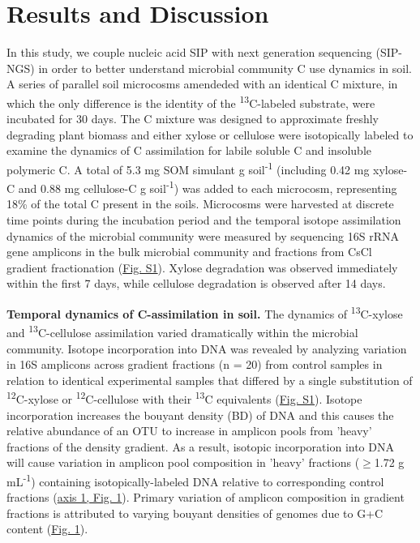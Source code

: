 \section{Results and Discussion}

In this study, we couple nucleic acid SIP with next generation sequencing (SIP-NGS) in order to better understand microbial community C use dynamics in soil. A series of parallel soil microcosms amendeded with an identical C mixture, in which the only difference is the identity of the \textsuperscript{13}C-labeled substrate, were incubated for 30 days. The C mixture was designed to approximate freshly degrading plant biomass and either xylose or cellulose were isotopically labeled to examine the dynamics of C assimilation for labile soluble C and insoluble polymeric C. A total of 5.3 mg SOM simulant g soil\textsuperscript{-1} (including 0.42 mg xylose-C and 0.88 mg cellulose-C g soil\textsuperscript{-1}) was added to each microcosm, representing 18\% of the total C present in the soils. Microcosms were harvested at discrete time points during the incubation period and the temporal isotope assimilation dynamics of the microbial community were measured by sequencing 16S rRNA gene amplicons in the bulk microbial community and fractions from CsCl gradient fractionation (\href{https://www.authorea.com/users/3537/articles/8459/master/file/figures/20140708_ConceptualFig2/20140708_ConceptualFig2.pdf}{Fig. S1}). Xylose degradation was observed immediately within the first 7 days, while cellulose degradation is observed after 14 days.

\textbf{Temporal dynamics of C-assimilation in soil.}  
The dynamics of \textsuperscript{13}C-xylose and \textsuperscript{13}C-cellulose assimilation varied dramatically within the microbial community. Isotope incorporation into DNA was revealed by analyzing variation in 16S amplicons across gradient fractions (n = 20) from control samples in relation to identical experimental samples that differed by a single substitution of \textsuperscript{12}C-xylose or \textsuperscript{12}C-cellulose with their \textsuperscript{13}C equivalents (\href{https://www.authorea.com/users/3537/articles/8459/master/file/figures/20140708_ConceptualFig2/20140708_ConceptualFig2.pdf}{Fig. S1}). Isotope incorporation increases the bouyant density (BD) of DNA and this causes the relative abundance of an OTU to increase in amplicon pools from 'heavy' fractions of the density gradient. As a result, isotopic incorporation into DNA will cause variation in amplicon pool composition in 'heavy' fractions ($\geq$1.72 g mL\textsuperscript{-1}) containing isotopically-labeled DNA relative to corresponding control fractions (\href{https://www.authorea.com/users/3537/articles/3612/master/file/figures/ordination_all1/ordination_all1.png}{axis 1, Fig. 1}). Primary variation of amplicon composition in gradient fractions is attributed to varying bouyant densities of genomes due to G+C content (\href{https://www.authorea.com/users/3537/articles/3612/master/file/figures/ordination_all1/ordination_all1.png}{Fig. 1}). 

